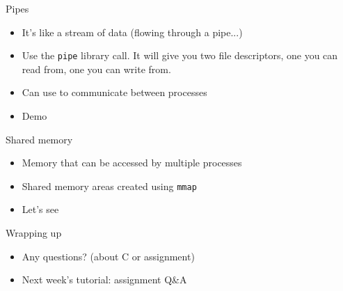 \documentclass[notes]{beamer}
\begin{document}
\begin{frame}{Pipes}
    \begin{itemize}
	\item It's like a stream of data (flowing through a pipe...)
	\item Use the \texttt{pipe} library call. It will give you two file descriptors, one you can read from, one you can write from.
	\item Can use to communicate between processes
	\item Demo
    \end{itemize}
\end{frame}

\begin{frame}{Shared memory}
    \begin{itemize}
	\item Memory that can be accessed by multiple processes
	\item Shared memory areas created using \texttt{mmap}
	\item Let's see
    \end{itemize}
\end{frame}

\begin{frame}{Wrapping up}
    \begin{itemize}
	\item Any questions? (about C or assignment)
	\item Next week's tutorial: assignment Q\&A
    \end{itemize}
\end{frame}
\end{document}
